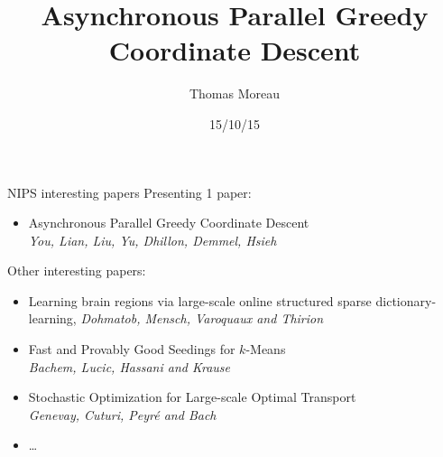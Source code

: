 \documentclass{beamer}
\title[Debrief NIPS]{Asynchronous Parallel Greedy\\Coordinate Descent}
\author{Thomas Moreau} %
\institute[CMLA]{ENS Paris-Saclay - CMLA}
\date{15/10/15} %
\begin{document}
 

\begin{frame}[t]
\titlepage 
\end{frame}


\begin{frame}{NIPS interesting papers}
	Presenting 1 paper:\\[.5em]
	\begin{itemize}
		\item Asynchronous Parallel Greedy Coordinate Descent\\
		{\scriptsize \it You, Lian, Liu, Yu, Dhillon, Demmel, Hsieh}\\[1em]
	\end{itemize}
	
	Other interesting papers:
	\begin{itemize}\itemsep.5em
		\item Learning brain regions via large-scale online structured sparse dictionary-learning,
		{\scriptsize \it Dohmatob, Mensch, Varoquaux and Thirion}
		\item Fast and Provably Good Seedings for $k$-Means \\
		{\scriptsize \it {Bachem, Lucic, Hassani and Krause}}
		\item Stochastic Optimization for Large-scale Optimal Transport \\
		{\scriptsize\it Genevay, Cuturi, Peyr{\'e} and Bach}
		\item \dots
	\end{itemize}
\end{frame}
\end{document}
